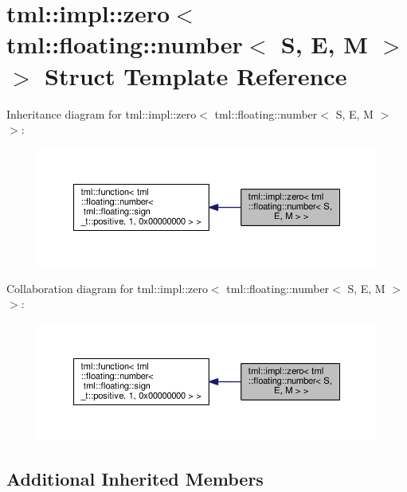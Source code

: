 \hypertarget{structtml_1_1impl_1_1zero_3_01tml_1_1floating_1_1number_3_01_s_00_01_e_00_01_m_01_4_01_4}{\section{tml\+:\+:impl\+:\+:zero$<$ tml\+:\+:floating\+:\+:number$<$ S, E, M $>$ $>$ Struct Template Reference}
\label{structtml_1_1impl_1_1zero_3_01tml_1_1floating_1_1number_3_01_s_00_01_e_00_01_m_01_4_01_4}
}


Inheritance diagram for tml\+:\+:impl\+:\+:zero$<$ tml\+:\+:floating\+:\+:number$<$ S, E, M $>$ $>$\+:
\nopagebreak
\begin{figure}[H]
\begin{center}
\leavevmode
\includegraphics[width=350pt]{structtml_1_1impl_1_1zero_3_01tml_1_1floating_1_1number_3_01_s_00_01_e_00_01_m_01_4_01_4__inherit__graph}
\end{center}
\end{figure}


Collaboration diagram for tml\+:\+:impl\+:\+:zero$<$ tml\+:\+:floating\+:\+:number$<$ S, E, M $>$ $>$\+:
\nopagebreak
\begin{figure}[H]
\begin{center}
\leavevmode
\includegraphics[width=350pt]{structtml_1_1impl_1_1zero_3_01tml_1_1floating_1_1number_3_01_s_00_01_e_00_01_m_01_4_01_4__coll__graph}
\end{center}
\end{figure}
\subsection*{Additional Inherited Members}


